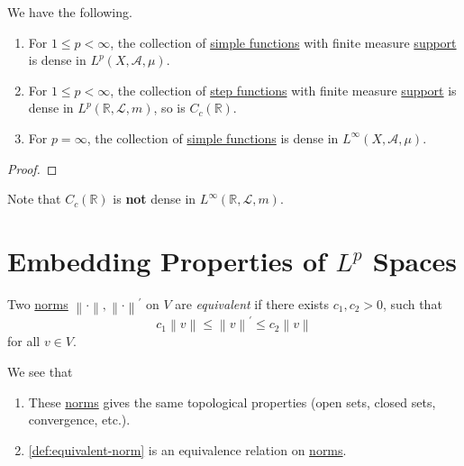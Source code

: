 \begin{proposition}
	We have the following.
	\begin{enumerate}[(1)]
		\item For \(1\leq p< \infty \), the collection of \hyperref[def:simple-function]{simple functions} with finite measure
		      \hyperref[def:support]{support} is dense in \(L^p(X, \mathcal{A} , \mu )\).
		\item For \(1\leq p<\infty \), the collection of \hyperref[def:step-function]{step functions} with finite measure
		      \hyperref[def:support]{support} is dense in \(L^p(\mathbb{R} , \mathcal{L} , m)\), so is \(C_c(\mathbb{R} )\).
		\item For \(p = \infty \), the collection of \hyperref[def:simple-function]{simple functions} is dense in \(L^{\infty} (X, \mathcal{A} , \mu )\).
	\end{enumerate}
\end{proposition}
\begin{proof}
\end{proof}
\begin{remark}
	Note that \(C_c(\mathbb{R} )\) is \textbf{not} dense in \(L^{\infty} (\mathbb{R} , \mathcal{L} , m)\).
\end{remark}

\section{Embedding Properties of \(L^p\) Spaces}
\begin{definition}\label{def:equivalent-norm}
	Two \hyperref[def:norm]{norms} \(\left\lVert \cdot\right\rVert, \left\lVert \cdot\right\rVert ^\prime  \) on \(V\) are \emph{equivalent} if there exists \(c_1, c_2>0\), such that
	\[
		c_1 \left\lVert v\right\rVert \leq \left\lVert v\right\rVert ^\prime \leq c_2 \left\lVert v\right\rVert
	\]
	for all \(v\in V\).
\end{definition}
\begin{note}
	We see that
	\begin{enumerate}[(1)]
		\item These \hyperref[def:norm]{norms} gives the same topological properties (open sets, closed sets, convergence, etc.).
		\item \autoref{def:equivalent-norm} is an equivalence relation on \hyperref[def:norm]{norms}.
	\end{enumerate}
\end{note}


